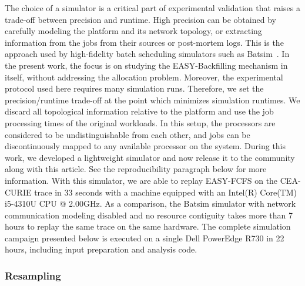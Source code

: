\documentclass[sigconf,anonymous]{acmart}
\begin{document}
The choice of a simulator is a critical part of experimental validation that
raises a trade-off between precision and runtime. High precision can be
obtained by carefully modeling the platform and its network topology, or
extracting information from the jobs from their sources or post-mortem logs.
This is the approach used by high-fidelity batch scheduling simulators such as
Batsim~\cite{batsim}. In the present work, the focus is on studying the
EASY-Backfilling mechanism in itself, without addressing the allocation
problem. Moreover, the experimental protocol used here requires many
simulation runs. Therefore, we set the precision/runtime trade-off at the
point which minimizes simulation runtimes. We discard all topological
information relative to the platform and use the job processing times of the
original workloads. In this setup, the processors are considered to be
undistinguishable from each other, and jobs can be discontinuously mapped to
any available processor on the system. During this work, we developed a
lightweight simulator\cite{ocst} and now release it to the community along with
this article. See the reproducibility paragraph below for more information.
With this simulator, we are able to replay EASY-FCFS on the CEA-CURIE trace in
33 seconds with a machine equipped with an Intel(R) Core(TM) i5-4310U CPU @
2.00GHz. As a comparison, the Batsim simulator with network communication
modeling disabled and no resource contiguity takes more than 7 hours to replay
the same trace on the same hardware. The complete simulation campaign presented
below is executed on a single Dell PowerEdge R730 in 22 hours, including input
preparation and analysis code.

\subsubsection{Resampling}
\label{ssub:resampling}
\end{document}
